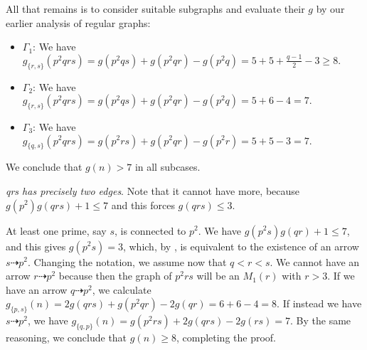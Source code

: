 \documentclass{article}
\newcommand{\hthref}[1]{\hyperref[#1]{\thref{#1}}}
\theoremstyle{plain}
\theoremstyle{definition}
\begin{document}
All that remains is to consider suitable subgraphs and evaluate their $g$ by our earlier analysis of regular graphs:
\begin{itemize}
	\item $\Gamma_1$: We have $g_{\{r, s\}}(p^2 q r s) = g(p^2 q s) + g(p^2 q r) - g(p^2 q) = 5 + 5 + \frac{q - 1}{2} - 3 \ge 8.$
	\item $\Gamma_2$: We have $g_{\{r, s\}}(p^2 q r s) = g(p^2 q s) + g(p^2 q r) - g(p^2 q) = 5 + 6 - 4 = 7.$
	\item $\Gamma_3$: We have $g_{\{q, s\}}(p^2 q r s) = g(p^2 r s) + g(p^2 q r) - g(p^2 r) = 5 + 5 - 3 = 7.$
\end{itemize}
We conclude that $g(n) > 7$ in all subcases.

 \emph{qrs has precisely two edges}. Note that it cannot have more, because $g(p^2)g(qrs) + 1 \le 7$ and this forces $g(qrs) \le 3$.

At least one prime, say $s$, is connected to $p^2$. We have $g(p^2 s)g(qr) + 1 \le 7$, and this gives $g(p^2 s) = 3$, which, by \hthref{euppq}, is equivalent to the existence of an arrow $s \dashrightarrow p^2$. Changing the notation, we assume now that $q < r < s$. We cannot have an arrow $r \dashrightarrow p^2$ because then the graph of $p^2 r s$ will be an $M_1(r)$ with $r > 3$. If we have an arrow $q \dashrightarrow p^2$, we calculate $g_{\{p, s\}}(n) = 2g(qrs) + g(p^2 q r) - 2g(qr) = 6 + 6 - 4 = 8.$ If instead we have $s \dashrightarrow p^2$, we have $g_{\{q, p\}}(n) = g(p^2 r s) + 2g(qrs) - 2g(rs) = 7$. By the same reasoning, we conclude that $g(n) \ge 8$, completing the proof.
\end{document}

